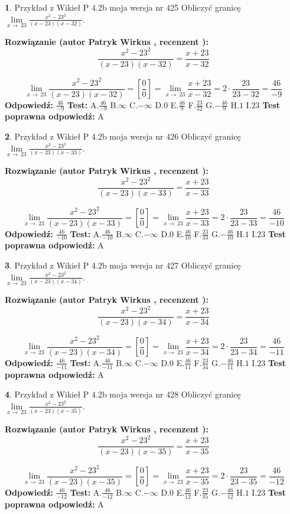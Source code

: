 \documentclass[12pt, a4paper]{article}
\theoremstyle{definition} %
\newtheorem{zad}{}
\newcommand{\zadStart}[1]{\begin{zad}#1\newline}
\newcommand{\zadStop}{\end{zad}}
\newcommand{\rozwStart}[2]{\noindent \textbf{Rozwiązanie (autor #1 , recenzent #2): }\newline}
\newcommand{\rozwStop}{\newline}
\newcommand{\odpStart}{\noindent \textbf{Odpowiedź:}\newline}
\newcommand{\odpStop}{\newline}
\newcommand{\testStart}{\noindent \textbf{Test:}\newline}
\newcommand{\testStop}{\newline}
\newcommand{\kluczStart}{\noindent \textbf{Test poprawna odpowiedź:}\newline}
\newcommand{\kluczStop}{\newline}
\begin{document}
\zadStart{Przykład z Wikieł P 4.2b moja wersja nr 425}
Obliczyć granicę $\lim\limits_{x\to\ 23}\frac{x^{2}-23^{2}}{(x-23)(x-32)}$.
\zadStop
\rozwStart{Patryk Wirkus}{}
$$\frac{x^{2}-23^{2}}{(x-23)(x-32)}=\frac{x+23}{x-32}$$

$$\lim\limits_{x\to\ 23}\frac{x^{2}-23^{2}}{(x-23)(x-32)}=[\frac{0}{0}]=\lim\limits_{x\to\ 23}\frac{x+23}{x-32}=2 \cdot \frac{23}{23-32} = \frac{46}{-9}$$
\rozwStop
\odpStart
$\frac{46}{-9}$
\odpStop
\testStart
A.$\frac{46}{-9}$
B.$\infty$
C.$-\infty$
D.$0$
E.$\frac{46}{9}$
F.$\frac{23}{32}$
G.$-\frac{46}{9}$
H.$1$
I.$23$
\testStop
\kluczStart
A
\kluczStop



\zadStart{Przykład z Wikieł P 4.2b moja wersja nr 426}
Obliczyć granicę $\lim\limits_{x\to\ 23}\frac{x^{2}-23^{2}}{(x-23)(x-33)}$.
\zadStop
\rozwStart{Patryk Wirkus}{}
$$\frac{x^{2}-23^{2}}{(x-23)(x-33)}=\frac{x+23}{x-33}$$

$$\lim\limits_{x\to\ 23}\frac{x^{2}-23^{2}}{(x-23)(x-33)}=[\frac{0}{0}]=\lim\limits_{x\to\ 23}\frac{x+23}{x-33}=2 \cdot \frac{23}{23-33} = \frac{46}{-10}$$
\rozwStop
\odpStart
$\frac{46}{-10}$
\odpStop
\testStart
A.$\frac{46}{-10}$
B.$\infty$
C.$-\infty$
D.$0$
E.$\frac{46}{10}$
F.$\frac{23}{33}$
G.$-\frac{46}{10}$
H.$1$
I.$23$
\testStop
\kluczStart
A
\kluczStop



\zadStart{Przykład z Wikieł P 4.2b moja wersja nr 427}
Obliczyć granicę $\lim\limits_{x\to\ 23}\frac{x^{2}-23^{2}}{(x-23)(x-34)}$.
\zadStop
\rozwStart{Patryk Wirkus}{}
$$\frac{x^{2}-23^{2}}{(x-23)(x-34)}=\frac{x+23}{x-34}$$

$$\lim\limits_{x\to\ 23}\frac{x^{2}-23^{2}}{(x-23)(x-34)}=[\frac{0}{0}]=\lim\limits_{x\to\ 23}\frac{x+23}{x-34}=2 \cdot \frac{23}{23-34} = \frac{46}{-11}$$
\rozwStop
\odpStart
$\frac{46}{-11}$
\odpStop
\testStart
A.$\frac{46}{-11}$
B.$\infty$
C.$-\infty$
D.$0$
E.$\frac{46}{11}$
F.$\frac{23}{34}$
G.$-\frac{46}{11}$
H.$1$
I.$23$
\testStop
\kluczStart
A
\kluczStop



\zadStart{Przykład z Wikieł P 4.2b moja wersja nr 428}
Obliczyć granicę $\lim\limits_{x\to\ 23}\frac{x^{2}-23^{2}}{(x-23)(x-35)}$.
\zadStop
\rozwStart{Patryk Wirkus}{}
$$\frac{x^{2}-23^{2}}{(x-23)(x-35)}=\frac{x+23}{x-35}$$

$$\lim\limits_{x\to\ 23}\frac{x^{2}-23^{2}}{(x-23)(x-35)}=[\frac{0}{0}]=\lim\limits_{x\to\ 23}\frac{x+23}{x-35}=2 \cdot \frac{23}{23-35} = \frac{46}{-12}$$
\rozwStop
\odpStart
$\frac{46}{-12}$
\odpStop
\testStart
A.$\frac{46}{-12}$
B.$\infty$
C.$-\infty$
D.$0$
E.$\frac{46}{12}$
F.$\frac{23}{35}$
G.$-\frac{46}{12}$
H.$1$
I.$23$
\testStop
\kluczStart
A
\kluczStop
\end{document}
